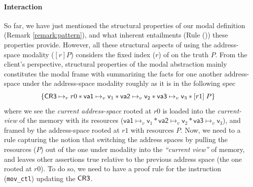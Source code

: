 \paragraph{Interaction}
\label{sec:interaction}
So far, we have just mentioned the structural properties of our modal definition (Remark \ref{remark:pattern}), and what inherent entailments (Rule \hbox{()}) these properties provide. However, all these structural aspects of using the address-space modality ($[r]P$) considers the fixed index ($r$) of on the truth $P$. From the client's perspective, structural properties of the modal abstraction mainly constitutes the modal frame with summarizing the facts for one another address-space under the address-space modality roughly as it is in the following spec
\[
\{ \textsf{CR3} \mapsto_{r} r0 \ast \textsf{va1} \mapsto_{v} \textsf{v}_1 \ast \textsf{va2} \mapsto_{v} \textsf{v}_2 \ast \textsf{va3} \mapsto_{v} \textsf{v}_3 \ast [r1]\;P \}
\]
where we see the \textit{current address-space} rooted at $r0$ is loaded into the  \textit{current-view} of the memory with its resources ($ \textsf{va1} \mapsto_{v} \textsf{v}_1 \ast \textsf{va2} \mapsto_{v} \textsf{v}_2 \ast \textsf{va3} \mapsto_{v} \textsf{v}_3$), and framed by the address-space rooted at $r1$ with resources $P$. 
Now, we need to a rule capturing the notion that switching the address spaces by pulling the resources ($P$) out of the one under modality into the \textit{“current view”} of memory, and leaves other assertions true relative to the previous address space (the one rooted at $r0$). To do so, we need to have a proof rule for the instruction (\lstinline|mov_ctl|) updating the $\textsf{CR3}$.

